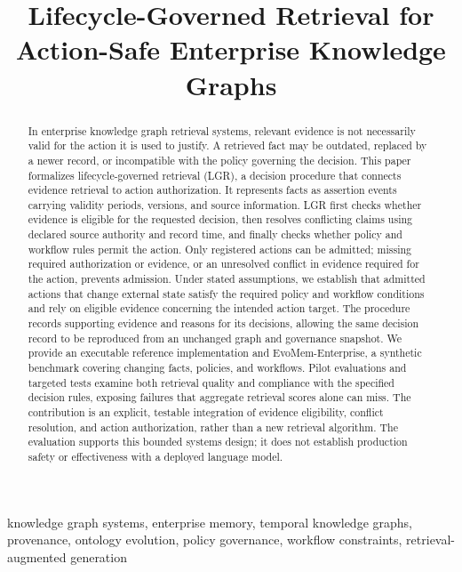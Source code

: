 \documentclass[conference]{IEEEtran}
\newcommand{\lgr}{\textsc{LGR}\xspace}
\begin{document}
\flushbottom
\title{Lifecycle-Governed Retrieval for Action-Safe Enterprise Knowledge Graphs}
\author{
}
\maketitle

\begin{abstract}
In enterprise knowledge graph retrieval systems, relevant evidence is not necessarily valid for the action it is used to justify. A retrieved fact may be outdated, replaced by a newer record, or incompatible with the policy governing the decision. This paper formalizes lifecycle-governed retrieval (\lgr), a decision procedure that connects evidence retrieval to action authorization. It represents facts as assertion events carrying validity periods, versions, and source information. \lgr first checks whether evidence is eligible for the requested decision, then resolves conflicting claims using declared source authority and record time, and finally checks whether policy and workflow rules permit the action. Only registered actions can be admitted; missing required authorization or evidence, or an unresolved conflict in evidence required for the action, prevents admission. Under stated assumptions, we establish that admitted actions that change external state satisfy the required policy and workflow conditions and rely on eligible evidence concerning the intended action target. The procedure records supporting evidence and reasons for its decisions, allowing the same decision record to be reproduced from an unchanged graph and governance snapshot. We provide an executable reference implementation and EvoMem-Enterprise, a synthetic benchmark covering changing facts, policies, and workflows. Pilot evaluations and targeted tests examine both retrieval quality and compliance with the specified decision rules, exposing failures that aggregate retrieval scores alone can miss. The contribution is an explicit, testable integration of evidence eligibility, conflict resolution, and action authorization, rather than a new retrieval algorithm. The evaluation supports this bounded systems design; it does not establish production safety or effectiveness with a deployed language model.
\end{abstract}
\begin{IEEEkeywords}
knowledge graph systems, enterprise memory, temporal knowledge graphs, provenance, ontology evolution, policy governance, workflow constraints, retrieval-augmented generation
\end{IEEEkeywords}
\end{document}
